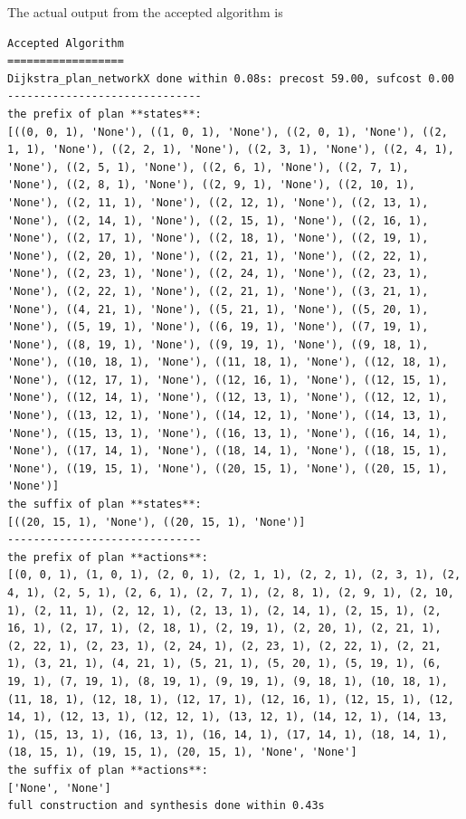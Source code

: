 The actual output from the accepted algorithm is 
\begin{lstlisting}
Accepted Algorithm
==================
Dijkstra_plan_networkX done within 0.08s: precost 59.00, sufcost 0.00
------------------------------
the prefix of plan **states**:
[((0, 0, 1), 'None'), ((1, 0, 1), 'None'), ((2, 0, 1), 'None'), ((2, 1, 1), 'None'), ((2, 2, 1), 'None'), ((2, 3, 1), 'None'), ((2, 4, 1), 'None'), ((2, 5, 1), 'None'), ((2, 6, 1), 'None'), ((2, 7, 1), 'None'), ((2, 8, 1), 'None'), ((2, 9, 1), 'None'), ((2, 10, 1), 'None'), ((2, 11, 1), 'None'), ((2, 12, 1), 'None'), ((2, 13, 1), 'None'), ((2, 14, 1), 'None'), ((2, 15, 1), 'None'), ((2, 16, 1), 'None'), ((2, 17, 1), 'None'), ((2, 18, 1), 'None'), ((2, 19, 1), 'None'), ((2, 20, 1), 'None'), ((2, 21, 1), 'None'), ((2, 22, 1), 'None'), ((2, 23, 1), 'None'), ((2, 24, 1), 'None'), ((2, 23, 1), 'None'), ((2, 22, 1), 'None'), ((2, 21, 1), 'None'), ((3, 21, 1), 'None'), ((4, 21, 1), 'None'), ((5, 21, 1), 'None'), ((5, 20, 1), 'None'), ((5, 19, 1), 'None'), ((6, 19, 1), 'None'), ((7, 19, 1), 'None'), ((8, 19, 1), 'None'), ((9, 19, 1), 'None'), ((9, 18, 1), 'None'), ((10, 18, 1), 'None'), ((11, 18, 1), 'None'), ((12, 18, 1), 'None'), ((12, 17, 1), 'None'), ((12, 16, 1), 'None'), ((12, 15, 1), 'None'), ((12, 14, 1), 'None'), ((12, 13, 1), 'None'), ((12, 12, 1), 'None'), ((13, 12, 1), 'None'), ((14, 12, 1), 'None'), ((14, 13, 1), 'None'), ((15, 13, 1), 'None'), ((16, 13, 1), 'None'), ((16, 14, 1), 'None'), ((17, 14, 1), 'None'), ((18, 14, 1), 'None'), ((18, 15, 1), 'None'), ((19, 15, 1), 'None'), ((20, 15, 1), 'None'), ((20, 15, 1), 'None')]
the suffix of plan **states**:
[((20, 15, 1), 'None'), ((20, 15, 1), 'None')]
------------------------------
the prefix of plan **actions**:
[(0, 0, 1), (1, 0, 1), (2, 0, 1), (2, 1, 1), (2, 2, 1), (2, 3, 1), (2, 4, 1), (2, 5, 1), (2, 6, 1), (2, 7, 1), (2, 8, 1), (2, 9, 1), (2, 10, 1), (2, 11, 1), (2, 12, 1), (2, 13, 1), (2, 14, 1), (2, 15, 1), (2, 16, 1), (2, 17, 1), (2, 18, 1), (2, 19, 1), (2, 20, 1), (2, 21, 1), (2, 22, 1), (2, 23, 1), (2, 24, 1), (2, 23, 1), (2, 22, 1), (2, 21, 1), (3, 21, 1), (4, 21, 1), (5, 21, 1), (5, 20, 1), (5, 19, 1), (6, 19, 1), (7, 19, 1), (8, 19, 1), (9, 19, 1), (9, 18, 1), (10, 18, 1), (11, 18, 1), (12, 18, 1), (12, 17, 1), (12, 16, 1), (12, 15, 1), (12, 14, 1), (12, 13, 1), (12, 12, 1), (13, 12, 1), (14, 12, 1), (14, 13, 1), (15, 13, 1), (16, 13, 1), (16, 14, 1), (17, 14, 1), (18, 14, 1), (18, 15, 1), (19, 15, 1), (20, 15, 1), 'None', 'None']
the suffix of plan **actions**:
['None', 'None']
full construction and synthesis done within 0.43s 
\end{lstlisting}

